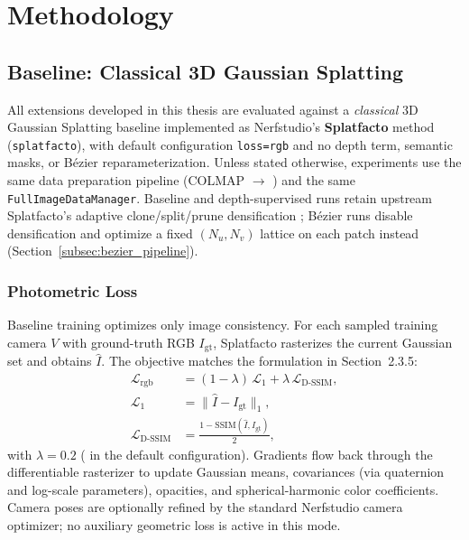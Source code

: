 ﻿\chapter{Methodology}
\label{chap:methodology}

\section{Baseline: Classical 3D Gaussian Splatting}
\label{sec:baseline_3dgs}

All extensions developed in this thesis are evaluated against a \emph{classical} 3D Gaussian Splatting baseline implemented as Nerfstudio's \textbf{Splatfacto} method (\texttt{splatfacto}), with default configuration \texttt{loss=rgb} and no depth term, semantic masks, or B\'ezier reparameterization. Unless stated otherwise, experiments use the same data preparation pipeline (COLMAP $\rightarrow$ ) and the same \texttt{FullImageDataManager}. Baseline and depth-supervised runs retain upstream Splatfacto's adaptive clone/split/prune densification \cite{kerbl2023gaussian,tancik2023nerfstudio}; B\'ezier runs disable densification and optimize a fixed $(N_u,N_v)$ lattice on each patch instead (Section~\ref{subsec:bezier_pipeline}).

\subsection{Photometric Loss}
\label{subsec:baseline_photometric}

Baseline training optimizes only image consistency. For each sampled training camera $V$ with ground-truth RGB $I_{\mathrm{gt}}$, Splatfacto rasterizes the current Gaussian set and obtains $\hat{I}$. The objective matches the formulation in Section~2.3.5:
\begin{align}
\mathcal{L}_{\mathrm{rgb}} &= (1-\lambda)\,\mathcal{L}_{1}+\lambda\,\mathcal{L}_{\text{D-SSIM}}, \\
\mathcal{L}_{1} &= \|\hat{I}-I_{\mathrm{gt}}\|_{1}, \\
\mathcal{L}_{\text{D-SSIM}} &= \frac{1-\mathrm{SSIM}(\hat{I},I_{\mathrm{gt}})}{2},
\label{eq:baseline_photometric}
\end{align}
with $\lambda=0.2$ ( in the default configuration). Gradients flow back through the differentiable  rasterizer to update Gaussian means, covariances (via quaternion and log-scale parameters), opacities, and spherical-harmonic color coefficients. Camera poses are optionally refined by the standard Nerfstudio camera optimizer; no auxiliary geometric loss is active in this mode.

